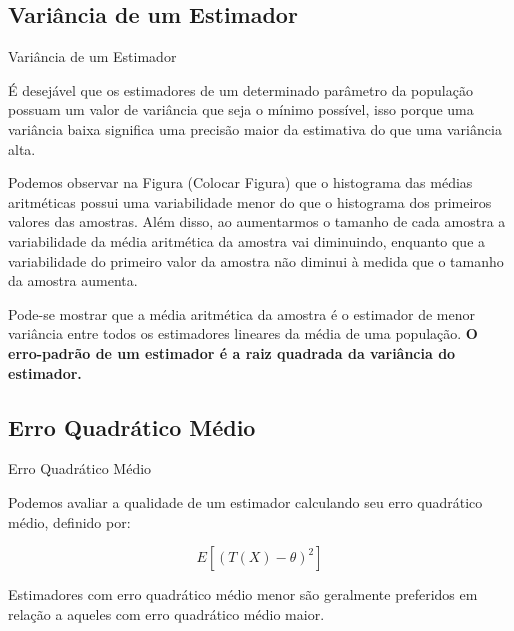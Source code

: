 \documentclass[12pt]{beamer}
\begin{document}
\subsection{Variância de um Estimador}
\begin{frame}{Variância de um Estimador}
\begin{block}{}
\justifying
É desejável que os estimadores de um determinado parâmetro da população possuam um valor de variância que seja o mínimo possível, isso porque uma variância baixa significa uma precisão maior da estimativa do que uma variância alta.

Podemos observar na Figura (Colocar Figura) que o histograma das médias aritméticas possui uma variabilidade menor do que o histograma dos primeiros valores das amostras. Além disso, ao aumentarmos o tamanho de cada amostra a variabilidade da média aritmética da amostra vai diminuindo, enquanto que a variabilidade do primeiro valor da amostra não diminui à medida que o tamanho da amostra aumenta.

Pode-se mostrar que a média aritmética da amostra é o estimador de menor variância entre todos os estimadores lineares da média de uma população. \textbf{O erro-padrão de um estimador é a raiz quadrada
da variância do estimador.}
\end{block}
\end{frame}

\subsection{Erro Quadrático Médio}
\begin{frame}{Erro Quadrático Médio}
\begin{block}{}
\justifying
Podemos avaliar a qualidade de um estimador calculando seu erro quadrático médio, definido por:

\begin{equation}\label{EQM1}
E[(T(X) - \theta)^2]
\end{equation}

Estimadores com erro quadrático médio menor são geralmente preferidos em relação a aqueles com erro quadrático médio maior. 
\end{block}
\end{frame}
\end{document}
